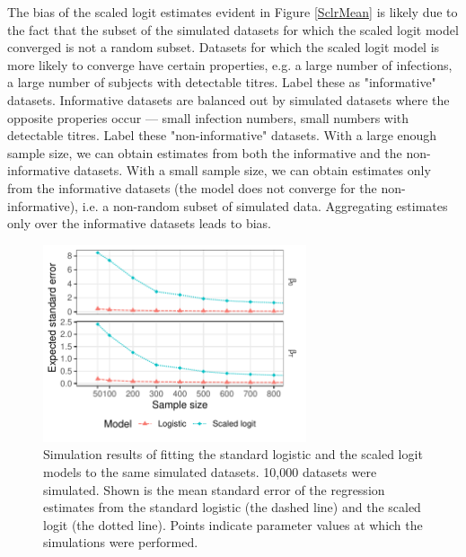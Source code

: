 The bias of the scaled logit estimates evident in Figure \ref{SclrMean} is likely due to the fact that the subset of the simulated datasets for which the scaled logit model converged is not a random subset. Datasets for which the scaled logit model is more likely to converge have certain properties, e.g. a large number of infections, a large number of subjects with detectable titres. Label these as "informative" datasets. Informative datasets are balanced out by simulated datasets where the opposite properies occur --- small infection numbers, small numbers with detectable titres. Label these "non-informative" datasets. With a large enough sample size, we can obtain estimates from both the informative and the non-informative datasets. With a small sample size, we can obtain estimates only from the informative datasets (the model does not converge for the non-informative), i.e. a non-random subset of simulated data. Aggregating estimates only over the informative datasets leads to bias.


\begin{figure}[htp]
	\centering
	\includegraphics[width=0.69\textwidth]{../logistic-plot/vary_nsam_se.pdf}
	\caption{
	Simulation results of fitting the standard logistic and the scaled logit models to the same simulated datasets. 10,000 datasets were simulated. Shown is the mean standard error of the regression estimates from the standard logistic (the dashed line) and the scaled logit (the dotted line). Points indicate parameter values at which the simulations were performed.
	}
	\label{SclrSE}
\end{figure}


